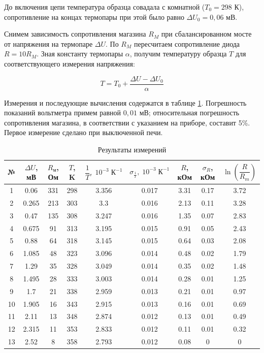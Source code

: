 \documentclass[12pt]{kiarticle}
\begin{document}
	До включения цепи температура образца совадала с комнатной  ($T_0 = 298$ К), сопротивление на концах термопары при этой было равно $\Delta U_{0} = 0,06$ мВ.
	
	Снимем зависимость сопротивления магазина $R_M$ при сбалансированном мосте от напряжения на термопаре $\Delta U$. По $R_M$ пересчитаем сопротивление диода $R = 10R_M$. Зная константу термопары $\alpha$,  получим температуру образца $T$ для соответствующего измерения напряжения: 
	
	\[ T = T_0 + \frac{\Delta U - \Delta U_{0}}{\alpha} \] 
	
	Измерения и последующие вычисления содержатся в таблице \ref{table_5}. Погрешность показаний вольтметра примем равной $ 0,01 $ мВ; относительная погрешность сопротивления магазина, в соответствии с указанием на приборе, составит 5\%. Первое измерение сделано при выключенной печи. 
	
		\begin{table}[h]
		\caption{Результаты измерений}
		\begin{center}
			\begin{tabular}{|c|c|c|c|c|c|c|c|c|}
				\hline
				№ & $ \Delta U  $, мВ & $ R_м $, Ом &  $ T $, K & $ \dfrac{1}{T}, \; 10^{-3} \; К^{-1} $ & $ \sigma_{\frac{1}{T}}, \; 10^{-3} \; К^{-1}  $ &  $ R $, кОм & $ \sigma_R $, кОм &  $ \ln \left( \dfrac{R}{R_m} \right)  $ \\
				\hline
			1 & 0.06 & 331 & 298 & 3.356 & 0.017 & 3.31 & 0.17 & 3.72 \\
			2 & 0.265 & 213 & 303 & 3.3 & 0.016 & 2.13 & 0.11 & 3.28 \\
			3 & 0.47 & 135 & 308 & 3.247 & 0.016 & 1.35 & 0.07 & 2.83 \\
			4 & 0.675 & 91 & 313 & 3.195 & 0.015 & 0.91 & 0.05 & 2.43 \\
			5 & 0.88 & 64 & 318 & 3.145 & 0.015 & 0.64 & 0.03 & 2.08 \\
			6 & 1.085 & 48 & 323 & 3.096 & 0.014 & 0.48 & 0.02 & 1.79 \\
			7 & 1.29 & 35 & 328 & 3.049 & 0.014 & 0.35 & 0.02 & 1.48 \\
			8 & 1.495 & 28 & 333 & 3.003 & 0.014 & 0.28 & 0.01 & 1.25 \\
			9 & 1.7 & 21 & 338 & 2.959 & 0.013 & 0.21 & 0.01 & 0.97 \\
			10 & 1.905 & 16 & 343 & 2.915 & 0.013 & 0.16 & 0.01 & 0.69 \\
			11 & 2.11 & 13 & 348 & 2.874 & 0.012 & 0.13 & 0.01 & 0.49 \\
			12 & 2.315 & 11 & 353 & 2.833 & 0.012 & 0.11 & 0.01 & 0.32 \\
			13 & 2.52 & 8 & 358 & 2.793 & 0.012 & 0.08 & 0 & 0 \\
			\hline
			\end{tabular}
		\end{center}
		\label{table_5}
	\end{table}
\end{document}
